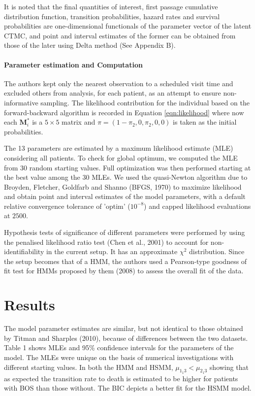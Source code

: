 \documentclass{uwstat572}
\begin{document}
It is noted that the final quantities of interest, first passage cumulative distribution function, transition probabilities, hazard rates and survival probabilities are one-dimensional functionals of the parameter vector of the latent CTMC, and point and interval estimates of the former can be obtained from those of the later using Delta method (See Appendix B).

\paragraph{Parameter estimation and Computation}
The authors kept only the nearest observation to a scheduled visit time and excluded others from analysis, for each patient, as an attempt to ensure non-informative sampling. The likelihood contribution for the individual based on the forward-backward algorithm is recorded in Equation \ref{eqn:likelihood} where now each $\bm{M}_i^*$ is a $5\times 5$ matrix and $\pi=(1-\pi_{2},0,\pi_{2},0,0)$ is taken as the initial probabilities.

The 13 parameters are estimated by a maximum likelihood estimate (MLE) considering all patients. To check for global optimum, we computed the MLE from 30 random starting values. Full optimization was then performed starting at the best value among the 30 MLEs. We used the quasi-Newton algorithm due to Broyden, Fletcher, Goldfarb and Shanno (BFGS, 1970) to maximize likelihood and obtain point and interval estimates of the model parameters, with a default relative convergence tolerance of 'optim' ($10^{-8}$) and capped likelihood evaluations at $2500$.

Hypothesis tests of significance of different parameters were performed  by using the penalised likelihood ratio test (Chen et al., 2001) to account for non-identifiability in the current setup. It has an approximate $\chi^2$ distribution. Since the setup becomes that of a HMM, the authors used a Pearson-type goodness of fit test for HMMs proposed by them (2008) to assess the overall fit of the data.
\section{Results}
The model parameter estimates are similar, but not identical to those obtained by Titman and Sharples (2010), because of differences between the two datasets. Table 1 shows MLEs and 95\% confidence intervals for the parameters of the model. The MLEs were unique on the basis of numerical investigations with different starting values. In both the HMM and HSMM, $\mu_{1_1 3}<\mu_{2_1 3}$ showing that as expected the transition rate to death is estimated to be higher for patients with BOS than those without. The BIC depicts a better fit for the HSMM model.
\end{document}
